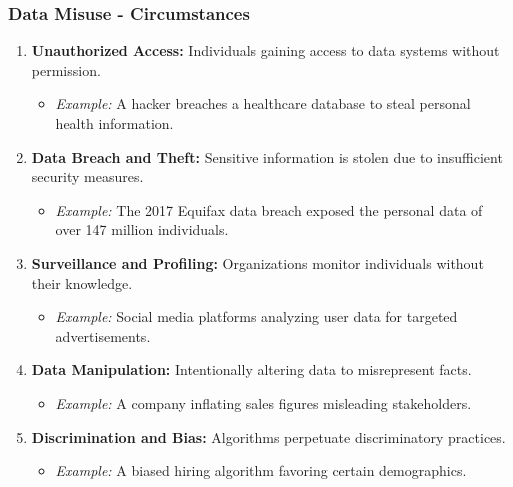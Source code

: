 \documentclass[aspectratio=169]{beamer}
\begin{document}
\begin{frame}[fragile]
    \frametitle{Data Misuse - Circumstances}
    \begin{enumerate}
        \item \textbf{Unauthorized Access:} 
              Individuals gaining access to data systems without permission.
              \begin{itemize}
                  \item \textit{Example:} A hacker breaches a healthcare database to steal personal health information.
              \end{itemize}
        
        \item \textbf{Data Breach and Theft:}
              Sensitive information is stolen due to insufficient security measures.
              \begin{itemize}
                  \item \textit{Example:} The 2017 Equifax data breach exposed the personal data of over 147 million individuals.
              \end{itemize}

        \item \textbf{Surveillance and Profiling:} 
              Organizations monitor individuals without their knowledge.
              \begin{itemize}
                  \item \textit{Example:} Social media platforms analyzing user data for targeted advertisements.
              \end{itemize}

        \item \textbf{Data Manipulation:}
              Intentionally altering data to misrepresent facts.
              \begin{itemize}
                  \item \textit{Example:} A company inflating sales figures misleading stakeholders.
              \end{itemize}

        \item \textbf{Discrimination and Bias:}
              Algorithms perpetuate discriminatory practices.
              \begin{itemize}
                  \item \textit{Example:} A biased hiring algorithm favoring certain demographics.
              \end{itemize}
    \end{enumerate}
\end{frame}
\end{document}
